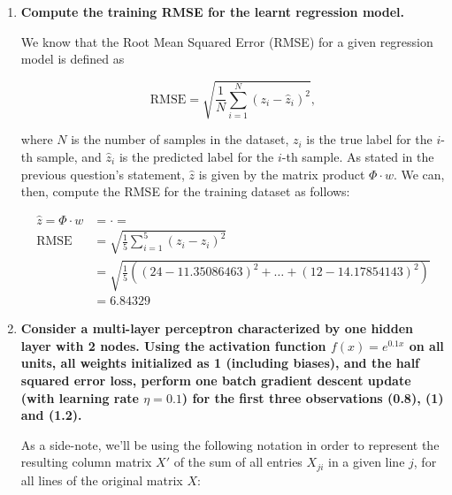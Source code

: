 \documentclass[12pt]{article}
\begin{document}
\begin{enumerate}[leftmargin=\labelsep]
        \pagebreak

  \item \textbf{Compute the training RMSE for the learnt regression model.}

        We know that the Root Mean Squared Error (RMSE) for a given regression model is
        defined as

        \begin{equation*}
          \text{RMSE} = \sqrt{\frac{1}{N} \sum_{i=1}^N (z_i - \hat{z}_i)^2},
        \end{equation*}

        where $N$ is the number of samples in the dataset, $z_i$ is the true label for
        the $i$-th sample, and $\hat{z}_i$ is the predicted label for the $i$-th sample.
        As stated in the previous question's statement, $\hat{z}$ is given by the matrix product
        $\Phi \cdot w$. We can, then, compute the RMSE for the training dataset as follows:

        \begin{equation*}
          \begin{aligned}
            \hat{z} = \Phi \cdot w & =  \cdot 
            =                                                                                  \\
            \text{RMSE}            & = \sqrt{\frac{1}{5} \sum_{i=1}^5 (z_i - \hat{z}_i)^2}                                    \\
                                   & = \sqrt{\frac{1}{5} \left( (24 - 11.35086463)^2 + \hdots + (12 - 14.17854143)^2 \right)} \\
                                   & = 6.84329
          \end{aligned}
        \end{equation*}

        \pagebreak

  \item \textbf{Consider a multi-layer perceptron characterized by one hidden layer with 2 nodes.
          Using the activation function $f(x) = e^{0.1x}$ on all units, all weights
          initialized as 1 (including biases), and the half squared error loss, perform
          one batch gradient descent update (with learning rate $\eta = 0.1$)
          for the first three observations (0.8), (1) and (1.2).
        }

        As a side-note, we'll be using the following notation in order to represent the resulting column matrix $X'$
        of the sum of all entries $X_{ji}$ in a given line $j$, for all lines of the original matrix $X$:


\end{enumerate}
\end{document}
